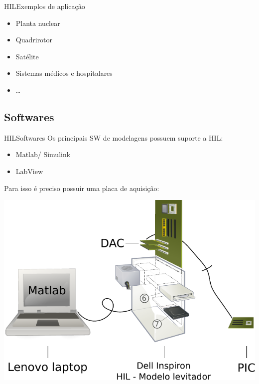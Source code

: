 \documentclass{beamer}
\begin{document}
\begin{frame}{HIL}{Exemplos de aplicação}
	\begin{itemize}
		\item Planta nuclear
		\item Quadrirotor
		\item Satélite
		\item Sistemas médicos e hospitalares
		\item \ldots
	\end{itemize} 
\end{frame}

\subsection{Softwares}

\begin{frame}{HIL}{Softwares}
	Os principais SW de modelagens possuem suporte a HIL:
	
	\begin{itemize}
		\item Matlab/ Simulink
		\item LabView
	\end{itemize}	
	
	Para isso é preciso possuir uma placa de aquisição:
	
	\begin{center}
	\includegraphics[width=0.5\linewidth]{material}
	\end{center}
\end{frame}
\end{document}
